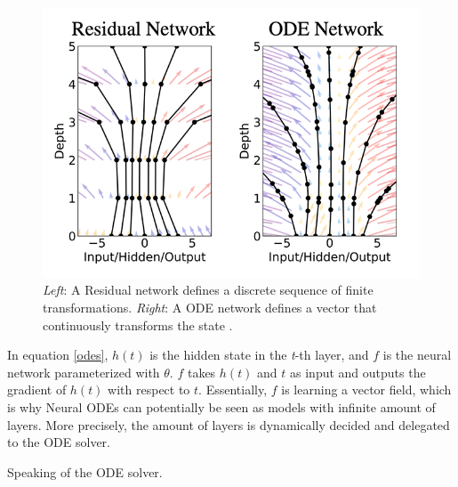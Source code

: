 \begin{figure}[ht]
      \centering
      \includegraphics[width=0.7\columnwidth]{figures/resnet_vs_odes.png}
      \caption{\emph{Left}: A Residual network defines a discrete sequence of finite transformations. \emph{Right}: A ODE network defines a vector that continuously transforms the state \citep{chen2018neural}.}
      \label{ode:resnet_vs_ode}
\end{figure}

In equation \ref{odes}, $ h(t) $ is the hidden state in the \emph{t}-th layer, and $ f $ is the neural network parameterized with $ \theta $. $ f $ takes $ h(t) $ and $ t $ as input and outputs the gradient of $ h(t) $ with respect to $ t $. Essentially, $ f $ is learning a vector field, which is why Neural ODEs can potentially be seen as models with infinite amount of layers. More precisely, the amount of layers is dynamically decided and delegated to the ODE solver.

Speaking of the ODE solver. 